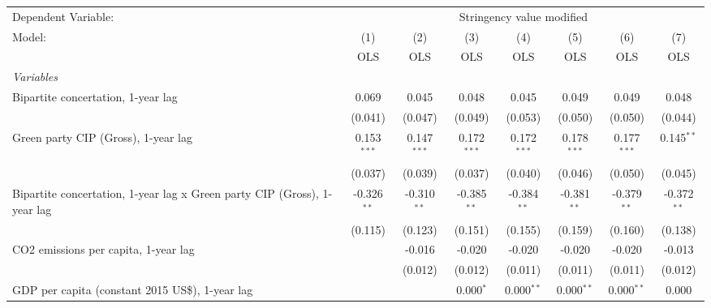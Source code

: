 
\begingroup
\centering
\begin{tabular}{lccccccc}
   \toprule
   Dependent Variable: & \multicolumn{7}{c}{Stringency value modified}\\
   Model:                                                                   & (1)           & (2)           & (3)           & (4)           & (5)           & (6)           & (7)\\  
                                                                            &  OLS          & OLS           & OLS           & OLS           & OLS           & OLS           & OLS\\  
   \midrule
   \emph{Variables}\\
   Bipartite concertation, 1-year lag                                       & 0.069         & 0.045         & 0.048         & 0.045         & 0.049         & 0.049         & 0.048\\   
                                                                            & (0.041)       & (0.047)       & (0.049)       & (0.053)       & (0.050)       & (0.050)       & (0.044)\\   
   Green party CIP (Gross), 1-year lag                                      & 0.153$^{***}$ & 0.147$^{***}$ & 0.172$^{***}$ & 0.172$^{***}$ & 0.178$^{***}$ & 0.177$^{***}$ & 0.145$^{**}$\\   
                                                                            & (0.037)       & (0.039)       & (0.037)       & (0.040)       & (0.046)       & (0.050)       & (0.045)\\   
   Bipartite concertation, 1-year lag x Green party CIP (Gross), 1-year lag & -0.326$^{**}$ & -0.310$^{**}$ & -0.385$^{**}$ & -0.384$^{**}$ & -0.381$^{**}$ & -0.379$^{**}$ & -0.372$^{**}$\\   
                                                                            & (0.115)       & (0.123)       & (0.151)       & (0.155)       & (0.159)       & (0.160)       & (0.138)\\   
   CO2 emissions per capita, 1-year lag                                     &               & -0.016        & -0.020        & -0.020        & -0.020        & -0.020        & -0.013\\   
                                                                            &               & (0.012)       & (0.012)       & (0.011)       & (0.011)       & (0.011)       & (0.012)\\   
   GDP per capita (constant 2015 US\$), 1-year lag                          &               &               & 0.000$^{*}$   & 0.000$^{**}$  & 0.000$^{**}$  & 0.000$^{**}$  & 0.000\\   

\end{tabular}
